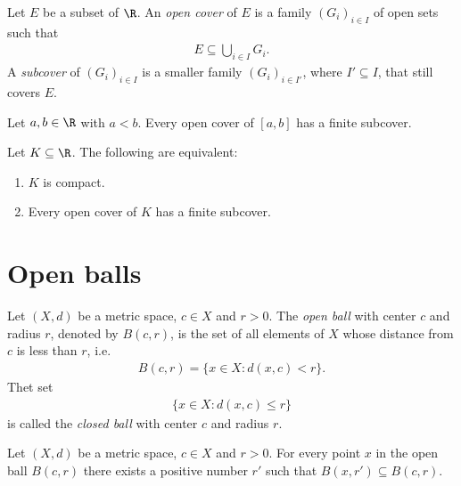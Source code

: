 \documentclass{article}
\begin{document}
\begin{definition}
    Let $E$ be a subset of $\R$. An \emph{open cover} of $E$ is a family
    $(G_i)_{i\in I}$ of open sets such that
    \begin{align*}
        E\subseteq \bigcup_{i\in I}G_i.
    \end{align*}
    A \emph{subcover} of $(G_i)_{i\in I}$ is a smaller family $(G_i)_{i\in I'}$,
    where $I'\subseteq I$, that still covers $E$.
\end{definition}

\begin{theorem}
    Let $a,b\in\R$ with $a<b$. Every open cover of $[a,b]$ has a finite subcover.
\end{theorem}

\begin{theorem}[Notes 2.21]
    Let $K\subseteq\R$. The following are equivalent:
    \begin{enumerate}
        \item $K$ is compact.
        \item Every open cover of $K$ has a finite subcover.
    \end{enumerate}
\end{theorem}

\section{Open balls}

\begin{definition}
    Let $(X,d)$ be a metric space, $c\in X$ and $r>0$. The \emph{open ball} with center $c$
    and radius $r$, denoted by $B(c,r)$, is the set of all elements of $X$ whose distance
    from $c$ is less than $r$, i.e.
    \begin{align*}
        B(c,r) = \{x\in X : d(x,c)<r\}.
    \end{align*}
    Thet set
    \begin{align*}
        \{x\in X: d(x,c)\leq r\}
    \end{align*}
    is called the \emph{closed ball} with center $c$ and radius $r$.
\end{definition}

\begin{proposition}[Notes 3.7]
    Let $(X,d)$ be a metric space, $c\in X$ and $r>0$. For every point $x$ in the open
    ball $B(c,r)$ there exists a positive number $r'$ such that $B(x,r')\subseteq B(c,r)$.
\end{proposition}
\end{document}
